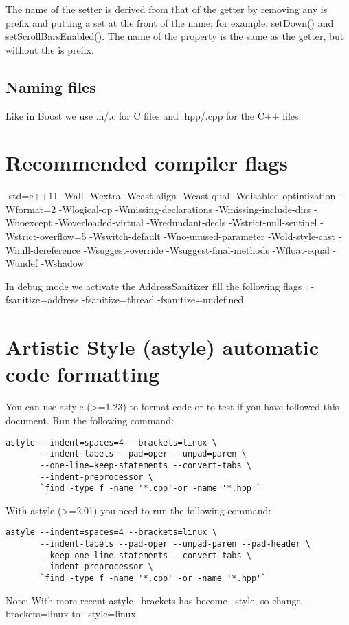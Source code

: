 \documentclass[a4paper,12pt]{article}
\begin{document}
The name of the setter is derived from that of the getter by removing any is prefix and putting a set at the front of the name; for example, setDown() and setScrollBarsEnabled(). The name of the property is the same as the getter, but without the is prefix.

\subsection{Naming files}
Like in Boost we use .h/.c for C files and .hpp/.cpp for the C++ files.

\clearpage
\newpage
\section{Recommended compiler flags}\label{sec:compiler_flags}
-std=c++11 -Wall -Wextra -Wcast-align -Wcast-qual -Wdisabled-optimization -Wformat=2 -Wlogical-op -Wmissing-declarations -Wmissing-include-dirs -Wnoexcept -Woverloaded-virtual -Wredundant-decls -Wstrict-null-sentinel -Wstrict-overflow=5 -Wswitch-default -Wno-unused-parameter -Wold-style-cast -Wnull-dereference -Wsuggest-override -Wsuggest-final-methods -Wfloat-equal -Wundef -Wshadow

In debug mode we activate the AddressSanitizer fill the following flags : -fsanitize=address -fsanitize=thread -fsanitize=undefined

\clearpage
\newpage
\section{Artistic Style (astyle) automatic code formatting}\label{sec:astyle}
You can use astyle (>=1.23) to format code or to test if you have followed this document. Run the following command:
\begin{lstlisting}[breaklines]
astyle --indent=spaces=4 --brackets=linux \
       --indent-labels --pad=oper --unpad=paren \
       --one-line=keep-statements --convert-tabs \
       --indent-preprocessor \
       `find -type f -name '*.cpp'-or -name '*.hpp'`
 \end{lstlisting}

With astyle (>=2.01) you need to run the following command:
\begin{lstlisting}[breaklines]
astyle --indent=spaces=4 --brackets=linux \
       --indent-labels --pad-oper --unpad-paren --pad-header \
       --keep-one-line-statements --convert-tabs \
       --indent-preprocessor \
       `find -type f -name '*.cpp' -or -name '*.hpp'`
 \end{lstlisting}

Note: With more recent astyle --brackets has become --style, so change --brackets=linux to --style=linux.
\end{document}
